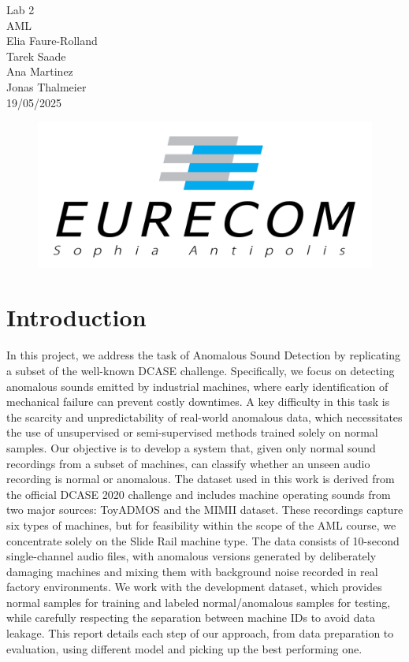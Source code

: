 \documentclass[ngerman]{scrartcl}
\begin{document}
\begin{titlepage}
\begin{center}
    \vspace{15cm}
    \huge{Lab 2}\\
    \vspace{2cm}
    \Huge{AML}\\
    \vspace{2cm}
    \Large{Elia Faure-Rolland}\\
    \Large{Tarek Saade}\\
    \Large{Ana Martinez}\\
    \Large{Jonas Thalmeier}\\
    \vspace{1cm}
    19/05/2025
\end{center}
\vspace{3cm}
\begin{figure}[h]
    \centering
    \includegraphics[width=.5\textwidth]{Figures/Eurecom.png}
\end{figure}
\end{titlepage}

\thispagestyle{empty}
\newpage
\setcounter{page}{1}

\section{Introduction}
In this project, we address the task of Anomalous Sound Detection by replicating a subset of the well-known DCASE challenge. Specifically, we focus on detecting anomalous sounds emitted by industrial machines, where early identification of mechanical failure can prevent costly downtimes. A key difficulty in this task is the scarcity and unpredictability of real-world anomalous data, which necessitates the use of unsupervised or semi-supervised methods trained solely on normal samples. Our objective is to develop a system that, given only normal sound recordings from a subset of machines, can classify whether an unseen audio recording is normal or anomalous. The dataset used in this work is derived from the official DCASE 2020 challenge and includes machine operating sounds from two major sources: ToyADMOS and the MIMII dataset. These recordings capture six types of machines, but for feasibility within the scope of the AML course, we concentrate solely on the Slide Rail machine type. The data consists of 10-second single-channel audio files, with anomalous versions generated by deliberately damaging machines and mixing them with background noise recorded in real factory environments. We work with the development dataset, which provides normal samples for training and labeled normal/anomalous samples for testing, while carefully respecting the separation between machine IDs to avoid data leakage. This report details each step of our approach, from data preparation to evaluation, using different model and picking up the best performing one.
\end{document}
